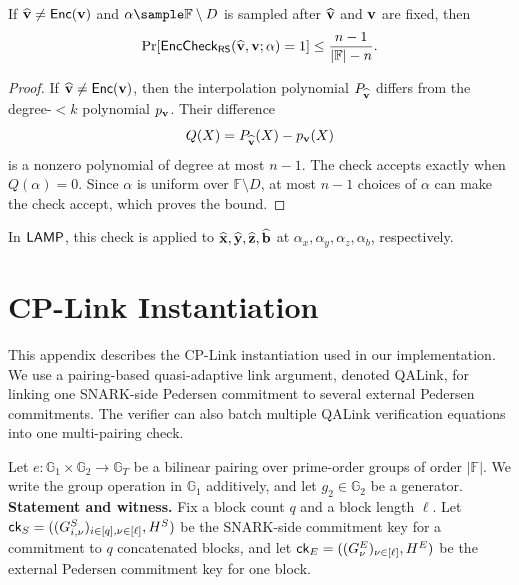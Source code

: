 \begin{lemma}
\label{lem:rs-barycentric-soundness}
If \(\widehat{\mathbf{v}}\neq\mathsf{Enc}(\mathbf{v})\) and
\(\alpha\sample\mathbb{F}\setminus D\) is sampled after
\(\widehat{\mathbf{v}}\) and \(\mathbf{v}\) are fixed, then
\[
  \Pr[
    \mathsf{EncCheck}_{\mathsf{RS}}
    (\widehat{\mathbf{v}},\mathbf{v};\alpha)=1
  ]
  \le
  \frac{n-1}{|\mathbb{F}|-n}.
\]
\end{lemma}

\begin{proof}
If \(\widehat{\mathbf{v}}\neq\mathsf{Enc}(\mathbf{v})\), then the interpolation polynomial
\(P_{\widehat{\mathbf{v}}}\) differs from the degree-\(<k\) polynomial
\(p_{\mathbf{v}}\).  Their difference
\[
  Q(X)=P_{\widehat{\mathbf{v}}}(X)-p_{\mathbf{v}}(X)
\]
is a nonzero polynomial of degree at most \(n-1\).  The check accepts exactly
when \(Q(\alpha)=0\).  Since \(\alpha\) is uniform over
\(\mathbb{F}\setminus D\), at most \(n-1\) choices of \(\alpha\) can make the
check accept, which proves the bound.
\end{proof}

In \(\textsf{LAMP}\), this check is applied to
\(\widehat{\mathbf{x}},\widehat{\mathbf{y}},\widehat{\mathbf{z}},\widehat{\mathbf{b}}\)
at \(\alpha_x,\alpha_y,\alpha_z,\alpha_b\), respectively.

\section{CP-Link Instantiation}
\label{app:cplink-instant}

This appendix describes the CP-Link instantiation used in our implementation.
We use a pairing-based quasi-adaptive link argument, denoted QALink, for
linking one SNARK-side Pedersen commitment to several external Pedersen
commitments.  The verifier can also batch multiple QALink verification
equations into one multi-pairing check.

Let \(e:\mathbb{G}_1\times\mathbb{G}_2\to\mathbb{G}_T\) be a bilinear pairing
over prime-order groups of order \(|\mathbb{F}|\).  We write the group
operation in \(\mathbb{G}_1\) additively, and let \(g_2\in\mathbb{G}_2\) be a
generator. \\

\noindent\textbf{Statement and witness.}
Fix a block count \(q\) and a block length \(\ell\).  Let
\({\textsf{ck}}_S=((G^S_{i,\nu})_{i\in[q],\nu\in[\ell]},H^S)\) be the SNARK-side
commitment key for a commitment to \(q\) concatenated blocks, and let
\({\textsf{ck}}_E=((G^E_{\nu})_{\nu\in[\ell]},H^E)\) be the external Pedersen commitment
key for one block.

